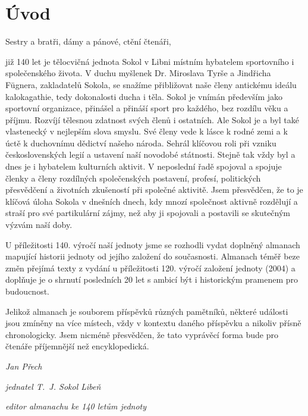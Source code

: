\documentclass[a5paper, 11pt, twoside]{article}
\begin{document}
\cleardoublepage


\setlength{\parskip}{0pt}

\section{Úvod}

Sestry a bratři, dámy a pánové, ctění čtenáři,

\noindent již 140 let je tělocvičná jednota Sokol v Libni místním hybatelem
sportovního i společenského života. V duchu myšlenek Dr. Miroslava Tyrše
a Jindřicha Fügnera, zakladatelů Sokola, se snažíme přibližovat naše
členy antickému ideálu kalokagathie, tedy dokonalosti ducha i těla.
Sokol je vnímán především jako sportovní organizace, přinášel a přináší
sport pro každého, bez rozdílu věku a příjmu. Rozvíjí tělesnou zdatnost
svých členů i ostatních. Ale Sokol je a byl také vlastenecký v nejlepším
slova smyslu. Své členy vede k lásce k rodné zemi a k úctě k duchovnímu
dědictví našeho národa. Sehrál klíčovou roli při vzniku československých
legií a ustavení naší novodobé státnosti. Stejně tak vždy byl a dnes je
i hybatelem kulturních aktivit. V neposlední řadě spojoval a spojuje
členky a členy rozdílných společenských postavení, profesí, politických
přesvědčení a životních zkušeností při společné aktivitě. Jsem
přesvědčen, že to je klíčová úloha Sokola v dnešních dnech, kdy mnozí
společnost aktivně rozdělují a straší pro své partikulární zájmy, než
aby ji spojovali a postavili se skutečným výzvám naší doby.

U příležitosti 140. výročí naší jednoty jsme se rozhodli vydat doplněný
almanach mapující historii jednoty od jejího založení do současnosti.
Almanach téměř beze změn přejímá texty z vydání u příležitosti 120.
výročí založení jednoty (2004) a doplňuje je o shrnutí posledních 20 let
s ambicí být i historickým pramenem pro budoucnost.

Jelikož almanach je souborem příspěvků různých pamětníků, některé
události jsou zmíněny na více místech, vždy v kontextu daného příspěvku
a nikoliv přísně chronologicky. Jsem nicméně přesvědčen, že tato
vyprávěcí forma bude pro čtenáře příjemnější než encyklopedická.

\vspace{\baselineskip}
\hfill\textit{Jan Přech}

\hfill\textit{jednatel T.~J. Sokol Libeň}

\hfill\textit{editor almanachu ke 140 letům jednoty}
\clearpage
\end{document}
